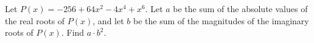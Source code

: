 Let $P(x) = -256+64x^2 -4x^4 +x^6$. Let $a$ be the sum of the absolute values of the real roots of $P(x)$, and let $b$ be the sum of the magnitudes of the imaginary roots of $P(x)$. Find $a \cdot b^2$.
